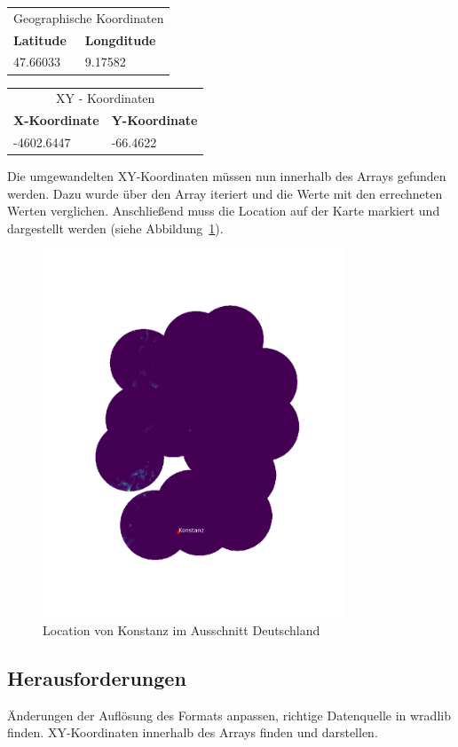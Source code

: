 \begin{table}[H]
\centering
\begin{tabularx}{8cm}{X|X}
\multicolumn{2}{c}{Geographische Koordinaten}\\
\textbf{Latitude} & \textbf{Longditude}\\\hline
47.66033          & 9.17582\\
\end{tabularx} 	
\end{table}

\begin{table}[H]
\centering
\begin{tabularx}{8cm}{X|X}
\multicolumn{2}{c}{XY - Koordinaten}\\
\textbf{X-Koordinate} & \textbf{Y-Koordinate}\\\hline
-4602.6447            & -66.4622\\
\end{tabularx} 	
\end{table}

Die umgewandelten XY-Koordinaten müssen nun innerhalb des Arrays gefunden werden. Dazu wurde über den Array iteriert und die Werte mit den errechneten Werten verglichen. Anschließend muss die Location auf der Karte markiert und dargestellt werden (siehe Abbildung~\ref{fig:location}).

\begin{figure}[H]
	\centering
	\includegraphics[width=0.8\textwidth]{pics/Location.png}
	\caption{Location von Konstanz im Ausschnitt Deutschland}
	\label{fig:location}
\end{figure}

\subsection{Herausforderungen} 
Änderungen der Auflösung des Formats anpassen, richtige Datenquelle in wradlib finden. XY-Koordinaten innerhalb des Arrays finden und darstellen.